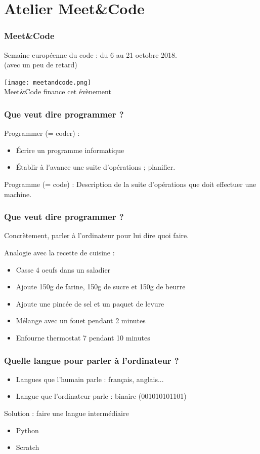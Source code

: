 \documentclass{beamer}
\begin{document}
\section{Atelier Meet\&Code}

\begin{frame}
    \frametitle{Meet\&Code}
    Semaine européenne du code : du 6 au 21 octobre 2018.
    \\(avec un peu de retard)
    \begin{center}
        \texttt{[image: meetandcode.png]}
        \\Meet\&Code finance cet évènement
    \end{center}
\end{frame}

\begin{frame}
    \frametitle{Que veut dire programmer ?}
    Programmer (= coder) :
    \begin{itemize}
    \item Écrire un programme informatique
    \item Établir à l'avance une suite d'opérations ; planifier.
    \end{itemize}

    Programme (= code) : Description de la suite d'opérations que doit effectuer une machine.
\end{frame}

\begin{frame}
    \frametitle{Que veut dire programmer ?}
    Concrètement, parler à l'ordinateur pour lui dire quoi faire.

    Analogie avec la recette de cuisine :
    \begin{itemize}
        \item Casse 4 oeufs dans un saladier
        \item Ajoute 150g de farine, 150g de sucre et 150g de beurre
        \item Ajoute une pincée de sel et un paquet de levure
        \item Mélange avec un fouet pendant 2 minutes
        \item Enfourne thermostat 7 pendant 10 minutes
    \end{itemize}
\end{frame}

\begin{frame}
    \frametitle{Quelle langue pour parler à l'ordinateur ?}
    \begin{itemize}
        \item Langues que l'humain parle : français, anglais...
        \item Langue que l'ordinateur parle : binaire (001010101101)
    \end{itemize}

    Solution : faire une langue intermédiaire
    \begin{itemize}
        \item Python
        \item Scratch
    \end{itemize}
\end{frame}
\end{document}

